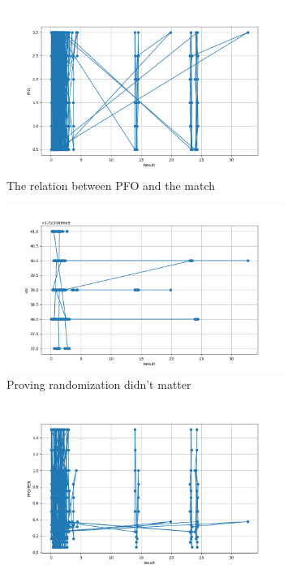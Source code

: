 \documentclass[]{article}
\begin{document}
\begin{figure}[h] %
	\centering
	\begin{subfigure}{0.45\textwidth}
		\centering
		\includegraphics[width=\textwidth]{QueryPFO.png}
		\caption{The relation between PFO and the match}
		\label{graphs:pfo}
	\end{subfigure}
	\hfill
	\begin{subfigure}{0.45\textwidth}
		\centering
		\includegraphics[width=\textwidth]{QueryScaleOfMatch.png}
		\caption{Proving randomization didn't matter}
		\label{graphs:random}
	\end{subfigure}
	\vfill
	\begin{subfigure}{0.45\textwidth}
		\centering
		\includegraphics[width=\textwidth]{QueryRatio.png}

\end{subfigure}
\end{figure}
\end{document}
